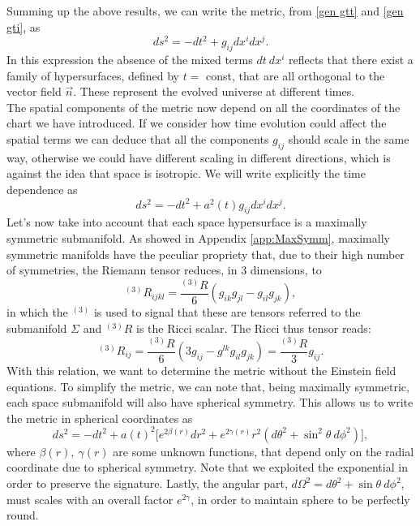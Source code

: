 Summing up the above results, we can write the metric, from \eqref{gen gtt} and \eqref{gen gti}, as
\begin{equation*}
    ds^2=-dt^2+g_{ij}dx^i dx^j.
\end{equation*}
In this expression the absence of the mixed terms $dt\ dx^i$ reflects that there exist a family of hypersurfaces, defined by $t=$ const, that are all orthogonal to the vector field $\vec n$. These represent the evolved universe at different times.\\
The spatial components of the metric now depend on all the coordinates of the chart we have introduced. If we consider how time evolution could affect the spatial terms we can deduce that all the components $g_{ij}$ should scale in the same way, otherwise we could have different scaling in different directions, which is against the idea that space is isotropic. We will write explicitly the time dependence as
\begin{equation*}
    ds^2=-dt^2+a^2(t)g_{ij}dx^i dx^j.
\end{equation*} 
Let's now take into account that each space hypersurface is a maximally symmetric submanifold. 
As showed in Appendix \ref{app:MaxSymm}, maximally symmetric manifolds have the peculiar propriety that, due to their high number of symmetries, the Riemann tensor reduces, in 3 dimensions, to 
\begin{equation*}
    ^{(3)}R_{ijkl}=\frac{^{(3)}R}{6}(g_{ik}g_{jl}-g_{il}g_{jk}),
\end{equation*}
in which the $^{(3)}$ is used to signal that these are tensors referred to the submanifold $\Sigma$ and $^{(3)}R$ is the Ricci scalar. The Ricci thus tensor reads:
\begin{equation}\label{maxsymRicci}
    ^{(3)}R_{ij}=\frac{^{(3)}R}{6}(3g_{ij}-g^{lk}g_{il}g_{jk})=\frac{^{(3)}R}{3}g_{ij}.
\end{equation}
With this relation, we want to determine the metric without the Einstein field equations.
To simplify the metric, we can note that, being maximally symmetric, each space submanifold will also have spherical symmetry. This allows us to write the metric in spherical coordinates as
\begin{equation*}
    ds^2=-dt^2+a(t)^2\big[e^{2\beta(r)}dr^2+e^{2\gamma(r)}r^2(d\theta^2+\sin^2\theta\ d\phi^2)\big],
\end{equation*}  
where $\beta(r),\ \gamma(r)$ are some unknown functions, that depend only on the radial coordinate due to spherical symmetry. Note that we exploited the exponential in order to preserve the signature. Lastly, the angular part, $d\Omega^2= d\theta^2+\sin\theta\ d\phi^2$, must scales with an overall factor $e^{2\gamma}$, in order to maintain sphere to be perfectly round.\\
